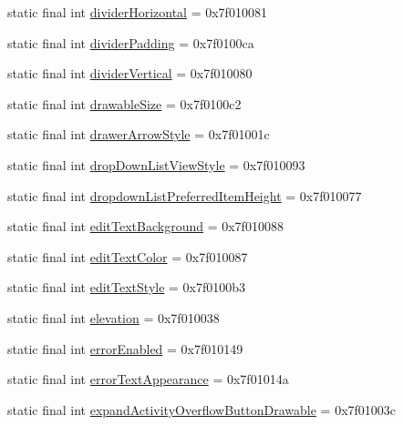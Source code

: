 \begin{CompactItemize}
static final int \hyperlink{classandroid_1_1support_1_1v7_1_1cardview_1_1_r_1_1attr_9ad9b01f29b0a318ae1a7f48b278cc89}{dividerHorizontal} = 0x7f010081
\item 
static final int \hyperlink{classandroid_1_1support_1_1v7_1_1cardview_1_1_r_1_1attr_40cbb419dd17896194e1d6fb4305cc28}{dividerPadding} = 0x7f0100ca
\item 
static final int \hyperlink{classandroid_1_1support_1_1v7_1_1cardview_1_1_r_1_1attr_1de7dd5348d19143c8e5eea726301bb7}{dividerVertical} = 0x7f010080
\item 
static final int \hyperlink{classandroid_1_1support_1_1v7_1_1cardview_1_1_r_1_1attr_191a589505f360c593f17dd77f8ca8a5}{drawableSize} = 0x7f0100c2
\item 
static final int \hyperlink{classandroid_1_1support_1_1v7_1_1cardview_1_1_r_1_1attr_c903191489a8a58a76d61c4d3854d2b8}{drawerArrowStyle} = 0x7f01001c
\item 
static final int \hyperlink{classandroid_1_1support_1_1v7_1_1cardview_1_1_r_1_1attr_0eca60ae28d36f8480b2c34ef79c4d2d}{dropDownListViewStyle} = 0x7f010093
\item 
static final int \hyperlink{classandroid_1_1support_1_1v7_1_1cardview_1_1_r_1_1attr_c065005c6740cb08ecc0b15e39fc6b56}{dropdownListPreferredItemHeight} = 0x7f010077
\item 
static final int \hyperlink{classandroid_1_1support_1_1v7_1_1cardview_1_1_r_1_1attr_c37bad1ac10fbad2f4735ac733ec4742}{editTextBackground} = 0x7f010088
\item 
static final int \hyperlink{classandroid_1_1support_1_1v7_1_1cardview_1_1_r_1_1attr_deced4732391bf240a1d032c1d1dde42}{editTextColor} = 0x7f010087
\item 
static final int \hyperlink{classandroid_1_1support_1_1v7_1_1cardview_1_1_r_1_1attr_71c1374df8e312ffda3fa624d396b76d}{editTextStyle} = 0x7f0100b3
\item 
static final int \hyperlink{classandroid_1_1support_1_1v7_1_1cardview_1_1_r_1_1attr_47b0fb93877cd94f4c735edb4df1bba1}{elevation} = 0x7f010038
\item 
static final int \hyperlink{classandroid_1_1support_1_1v7_1_1cardview_1_1_r_1_1attr_e59ad5bee61af52504eafa4d6320bfee}{errorEnabled} = 0x7f010149
\item 
static final int \hyperlink{classandroid_1_1support_1_1v7_1_1cardview_1_1_r_1_1attr_d1bd11dde6ff02691638fba5cf74fb1a}{errorTextAppearance} = 0x7f01014a
\item 
static final int \hyperlink{classandroid_1_1support_1_1v7_1_1cardview_1_1_r_1_1attr_7a86cf8b5b3fd570cd7ed44cabffbc1d}{expandActivityOverflowButtonDrawable} = 0x7f01003c

\end{CompactItemize}

